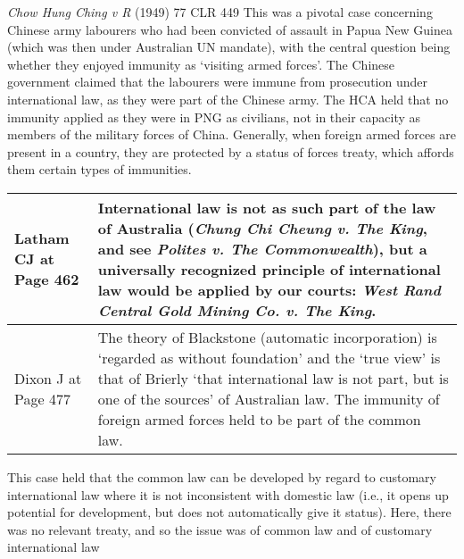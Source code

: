 \begin{casedetails}{\textit{Chow Hung Ching v R} (1949) 77 CLR 449}\label{case:Chow Hung Ching}
    \flushleft
    This was a pivotal case concerning Chinese army labourers who had been convicted of assault in Papua New Guinea (which was then under Australian UN mandate), with the central question being whether they enjoyed immunity as `visiting armed forces'. The Chinese government claimed that the labourers were immune from prosecution under international law, as they were part of the Chinese army. The HCA held that no immunity applied as they were in PNG as civilians, not in their capacity as members of the military forces of China. Generally, when foreign armed forces are present in a country, they are protected by a status of forces treaty, which affords them certain types of immunities. 

    \begin{longtable}{p{}|>{\raggedright\arraybackslash}p{}}
        Latham CJ at Page 462 & International law is not as such part of the law of Australia (\textit{Chung Chi Cheung v. The King}, and see \textit{Polites v. The Commonwealth}), but a universally recognized principle of international law would be applied by our courts: \textit{West Rand Central Gold Mining Co. v. The King}. \\\hline
        Dixon J at Page 477 & The theory of Blackstone (automatic incorporation) is `regarded as without foundation' and the `true view' is that of Brierly `that international law is not part, but is one of the sources' of Australian law. The immunity of foreign armed forces held to be part of the common law.
    \end{longtable}

    This case held that the common law can be developed by regard to customary international law where it is not inconsistent with domestic law (i.e., it opens up potential for development, but does not automatically give it status). Here, there was no relevant treaty, and so the issue was of common law and of customary international law
\end{casedetails}

